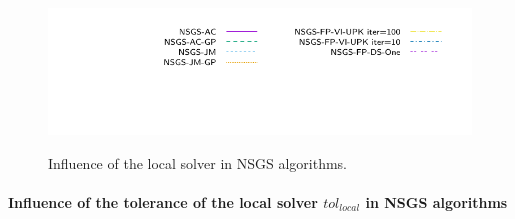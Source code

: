 \begin{figure}
{    \hspace{-2cm}\includegraphics[width=\widthfigure\textwidth]{../figure/NSGS/LocalSolver/time/profile-Cubes_H8_20_legend.pdf}}\vspace{-0.5cm}
  \caption{Influence of the local solver in NSGS algorithms.}
  \label{fig:NSGS/LocalSolver/time}
\end{figure}

\paragraph{Influence of the tolerance of the local solver $tol_{local}$ in NSGS algorithms}


